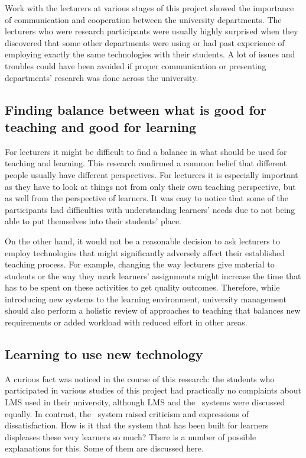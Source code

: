 Work with the lecturers at various stages of this project showed the importance
of communication and cooperation between the university departments. The
lecturers who were research participants were usually highly surprised when they
discovered that some other departments were using or had past experience of
employing exactly the same technologies with their students. A lot of issues and
troubles could have been avoided if proper communication or presenting
departments' research was done across the university.

\subsection[Finding Balance]{Finding balance between what is good for teaching
and good for learning}

For lecturers it might be difficult to find a balance in what should be used for
teaching and learning. This research confirmed a common belief that different
people usually have different perspectives. For lecturers it is especially
important as they have to look at things not from only their own teaching
perspective, but as well from the perspective of learners. It was easy to notice
that some of the participants had difficulties with understanding learners'
needs due to not being able to put themselves into their students' place.

On the other hand, it would not be a reasonable decision to ask lecturers to
employ technologies that might significantly adversely affect their established
teaching process. For example, changing the way lecturers give material to
students or the way they mark learners' assignments might increase the time that
has to be spent on these activities to get quality outcomes. Therefore, while
introducing new systems to the learning environment, university management
should also perform a holistic review of approaches to teaching that balances
new requirements or added workload with reduced effort in other areas.

\subsection[Learning to Use New Technology]{Learning to use new technology}

A curious fact was noticed in the course of this research: the students who
participated in various studies of this project had practically no complaints
about LMS used in their university, although LMS and the \ep~systems were
discussed equally. In contrast, the \ep~system raised criticism and expressions
of dissatisfaction. How is it that the system that has been built for learners
displeases these very learners so much? There is a number of possible
explanations for this. Some of them are discussed here.


